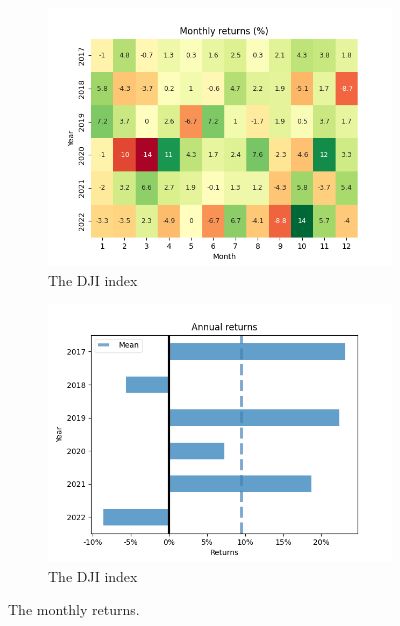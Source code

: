 \documentclass[../xlapes02]{subfiles}
\begin{document}
\begin{figure}[h!]
        \begin{subfigure}[t]{\experimentimgwidth\textwidth}
            \centering
            \label{subfig:montly_returns_heatmap_dji}
            \includegraphics[width=\linewidth]{image/figure/monthly_returns_heatmap_dji}
            \caption{The DJI index}
        \end{subfigure}
        \hfill
        \begin{subfigure}[t]{\experimentimgwidth\textwidth}
            \centering
            \label{subfig:annual_returns_dji}
            \includegraphics[width=\linewidth]{image/figure/annual_returns_dji}
            \caption{The DJI index}
        \end{subfigure}

        \caption{The monthly returns.}
        \label{fig:month_annual_returns}
    \end{figure}
\end{document}
